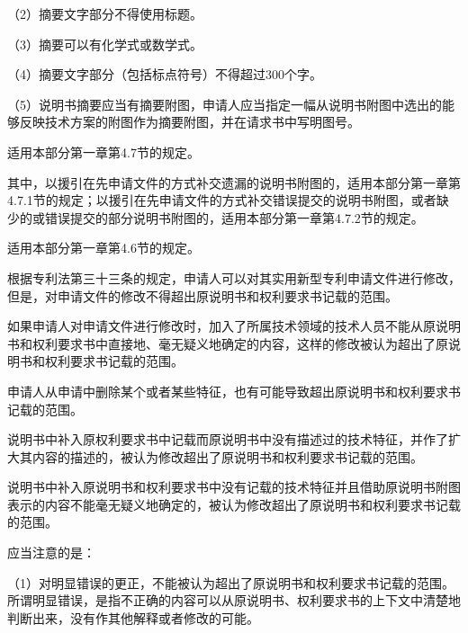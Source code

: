 {\setlength{\parindent}{17.1bp}（2）摘要文字部分不得使用标题。\par}

{\setlength{\parindent}{17.1bp}（3）摘要可以有化学式或数学式。\par}

{\setlength{\parindent}{17.1bp}（4）摘要文字部分（包括标点符号）不得超过300个字。\par}

{\setlength{\parindent}{17.1bp}（5）说明书摘要应当有摘要附图，申请人应当指定一幅从说明书附图中选出的能够反映技术方案的附图作为摘要附图，并在请求书中写明图号。\par}

适用本部分第一章第4.7节的规定。

其中，以援引在先申请文件的方式补交遗漏的说明书附图的，适用本部分第一章第4.7.1节的规定；以援引在先申请文件的方式补交错误提交的说明书附图，或者缺少的或错误提交的部分说明书附图的，适用本部分第一章第4.7.2节的规定。

适用本部分第一章第4.6节的规定。

根据专利法第三十三条的规定，申请人可以对其实用新型专利申请文件进行修改，但是，对申请文件的修改不得超出原说明书和权利要求书记载的范围。

如果申请人对申请文件进行修改时，加入了所属技术领域的技术人员不能从原说明书和权利要求书中直接地、毫无疑义地确定的内容，这样的修改被认为超出了原说明书和权利要求书记载的范围。

申请人从申请中删除某个或者某些特征，也有可能导致超出原说明书和权利要求书记载的范围。

说明书中补入原权利要求书中记载而原说明书中没有描述过的技术特征，并作了扩大其内容的描述的，被认为修改超出了原说明书和权利要求书记载的范围。

说明书中补入原说明书和权利要求书中没有记载的技术特征并且借助原说明书附图表示的内容不能毫无疑义地确定的，被认为修改超出了原说明书和权利要求书记载的范围。

应当注意的是：

{\setlength{\parindent}{17.1bp}（1）对明显错误的更正，不能被认为超出了原说明书和权利要求书记载的范围。所谓明显错误，是指不正确的内容可以从原说明书、权利要求书的上下文中清楚地判断出来，没有作其他解释或者修改的可能。\par}

